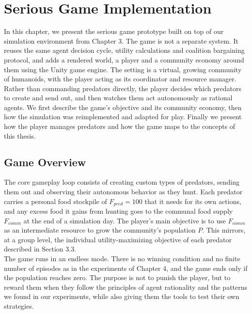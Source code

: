 \documentclass[12pt,a4paper]{report}
\begin{document}
	\chapter{Serious Game Implementation}
	\label{ch:game}
	
	In this chapter, we present the serious game prototype built on top of our simulation environment from Chapter 3. The game is not a separate system. It reuses the same agent decision cycle, utility calculations and coalition bargaining protocol, and adds a rendered world, a player and a community economy around them using the Unity game engine. The setting is a virtual, growing community of humanoids, with the player acting as its coordinator and resource manager. Rather than commanding predators directly, the player decides which predators to create and send out, and then watches them act autonomously as rational agents. We first describe the game’s objective and its community economy, then how the simulation was reimplemented and adapted for play. Finally we present how the player manages predators and how the game maps to the concepts of this thesis.

	\section{Game Overview}

	The core gameplay loop consists of creating custom types of predators, sending them out and observing their autonomous behavior as they hunt. Each predator carries a personal food stockpile of $F_{pred} = 100$ that it needs for its own actions, and any excess food it gains from hunting goes to the communal food supply $F_{comm}$ at the end of a simulation day. The player’s main objective is to use $F_{comm}$ as an intermediate resource to grow the community’s population $P$. This mirrors, at a group level, the individual utility-maximizing objective of each predator described in Section 3.3. \\

	The game runs in an endless mode. There is no winning condition and no finite number of episodes as in the experiments of Chapter 4, and the game ends only if the population reaches zero. The purpose is not to punish the player, but to reward them when they follow the principles of agent rationality and the patterns we found in our experiments, while also giving them the tools to test their own strategies.
\end{document}
